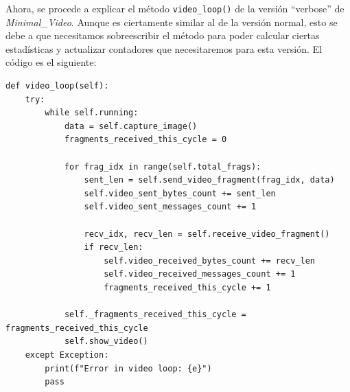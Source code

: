 Ahora, se procede a explicar el método \texttt{video\_loop()} de la versión ``verbose'' de \textit{Minimal\_Video}. Aunque es ciertamente similar al de la versión normal, esto se debe a que necesitamos sobreescribir el método para poder calcular ciertas estadísticas y actualizar contadores que necesitaremos para esta versión. El código es el siguiente:

\begin{lstlisting}[style=pythonstyle, caption={Método \texttt{video\_loop()} de \textit{Minimal\_Video\_verbose}.}, label={lst:video_loop_minimal_video_verbose}]
def video_loop(self):
    try:
        while self.running:
            data = self.capture_image()
            fragments_received_this_cycle = 0

            for frag_idx in range(self.total_frags):
                sent_len = self.send_video_fragment(frag_idx, data)
                self.video_sent_bytes_count += sent_len
                self.video_sent_messages_count += 1

                recv_idx, recv_len = self.receive_video_fragment()
                if recv_len:
                    self.video_received_bytes_count += recv_len
                    self.video_received_messages_count += 1
                    fragments_received_this_cycle += 1

            self._fragments_received_this_cycle = fragments_received_this_cycle
            self.show_video()
    except Exception:
        print(f"Error in video loop: {e}")
        pass
\end{lstlisting}
\vspace{\baselineskip}

